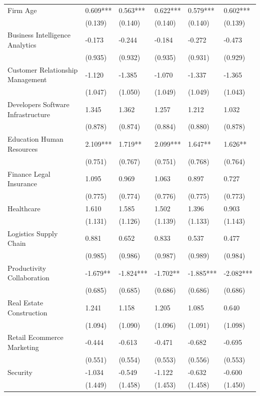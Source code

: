 \documentclass[12pt]{article}
\begin{document}
\begin{table}[!ht]
\begin{tabular}{llllll}
        Firm Age & 0.609*** & 0.563*** & 0.622*** & 0.579*** & 0.602*** \\
        ~ & (0.139) & (0.140) & (0.140) & (0.140) & (0.139) \\
        Business Intelligence Analytics & -0.173 & -0.244 & -0.184 & -0.272 & -0.473 \\
        ~ & (0.935) & (0.932) & (0.935) & (0.931) & (0.929) \\
        Customer Relationship Management & -1.120 & -1.385 & -1.070 & -1.337 & -1.365 \\
        ~ & (1.047) & (1.050) & (1.049) & (1.049) & (1.043) \\
        Developers Software Infrastructure & 1.345 & 1.362 & 1.257 & 1.212 & 1.032 \\
        ~ & (0.878) & (0.874) & (0.884) & (0.880) & (0.878) \\
        Education Human Resources & 2.109*** & 1.719** & 2.099*** & 1.647** & 1.626** \\
        ~ & (0.751) & (0.767) & (0.751) & (0.768) & (0.764) \\
        Finance Legal Insurance & 1.095 & 0.969 & 1.063 & 0.897 & 0.727 \\
        ~ & (0.775) & (0.774) & (0.776) & (0.775) & (0.773) \\
        Healthcare & 1.610 & 1.585 & 1.502 & 1.396 & 0.903 \\
        ~ & (1.131) & (1.126) & (1.139) & (1.133) & (1.143) \\
        Logistics Supply Chain & 0.881 & 0.652 & 0.833 & 0.537 & 0.477 \\
        ~ & (0.985) & (0.986) & (0.987) & (0.989) & (0.984) \\
        Productivity Collaboration & -1.679** & -1.824*** & -1.702** & -1.885*** & -2.082*** \\
        ~ & (0.685) & (0.685) & (0.686) & (0.686) & (0.686) \\
        Real Estate Construction & 1.241 & 1.158 & 1.205 & 1.085 & 0.640 \\
        ~ & (1.094) & (1.090) & (1.096) & (1.091) & (1.098) \\
        Retail Ecommerce Marketing & -0.444 & -0.613 & -0.471 & -0.682 & -0.695 \\
        ~ & (0.551) & (0.554) & (0.553) & (0.556) & (0.553) \\
        Security & -1.034 & -0.549 & -1.122 & -0.632 & -0.600 \\
        ~ & (1.449) & (1.458) & (1.453) & (1.458) & (1.450) \\

\end{tabular}
\end{table}
\end{document}

